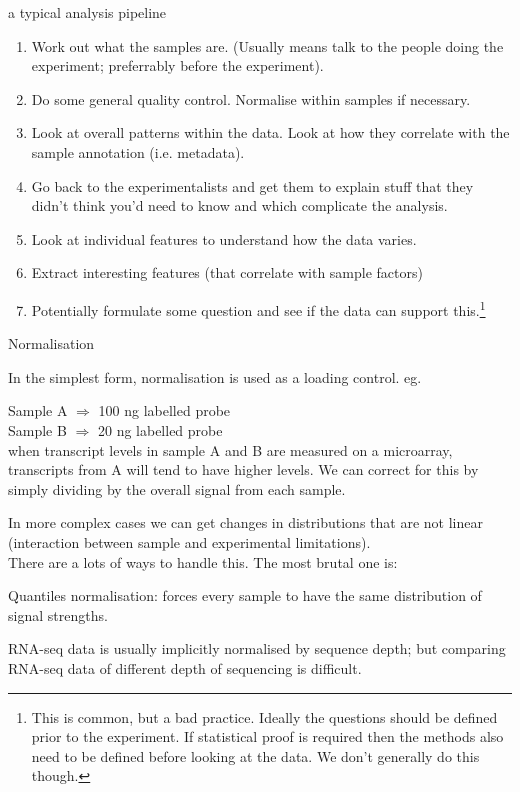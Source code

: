 \documentclass[pdf]{beamer}
\begin{document}
\begin{frame}{a typical analysis pipeline}

  {\small
  \begin{enumerate}
  \item Work out what the samples are. (Usually means talk to
    the people doing the experiment; preferrably before the experiment).
  \item Do some general quality control. Normalise within samples if necessary.
  \item Look at overall patterns within the data. Look at how they correlate
    with the sample annotation (i.e. metadata).
  \item Go back to the experimentalists and get them to explain stuff that
    they didn't think you'd need to know and which complicate the analysis.
  \item Look at individual features to understand how the data varies.
  \item Extract interesting features (that correlate with sample factors)
  \item Potentially formulate some question and see if the data can support 
    this.\footnote{This is common, but a bad practice. Ideally the questions
      should be defined prior to the experiment. If statistical proof is required
      then the methods also need to be defined before looking at the data. We
      don't generally do this though.}
  \end{enumerate}
}
\end{frame}

\begin{frame}{Normalisation}

  {\small
  In the simplest form, normalisation is used as a loading control.
  eg.

  Sample A $\Rightarrow$ 100 ng labelled probe\\
  Sample B $\Rightarrow$ 20 ng labelled probe\\

  when transcript levels in sample A and B are measured on a microarray,
  transcripts from A will tend to have higher levels. We can correct for
  this by simply dividing by the overall signal from each sample.

  In more complex cases we can get changes in distributions that are not
  linear (interaction between sample and experimental limitations). \\
  There are a lots of ways to handle this. The most brutal one is:

  Quantiles normalisation: forces every sample to have the same distribution of
  signal strengths.

  RNA-seq data is usually implicitly normalised by sequence depth; but comparing
  RNA-seq data of different depth of sequencing is difficult.
}
\end{frame}
\end{document}
